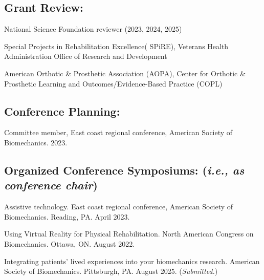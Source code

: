 \documentclass[letterpaper, 10pt]{article}
\begin{document}
\subsection{Grant Review:}
\begin{compactitem} %
    \item National Science Foundation reviewer (2023, 2024, 2025) %
    \item Special Projects in Rehabilitation Excellence( SPiRE), Veterans Health Administration Office of Research and Development
    \item American Orthotic \& Prosthetic Association (AOPA), Center for Orthotic \& Prosthetic Learning and Outcomes/Evidence-Based Practice (COPL)
\end{compactitem} %

\subsection{Conference Planning:}
\begin{compactenum} %
     \item Committee member, East coast regional conference, American Society of Biomechanics. 2023.
\end{compactenum} %

\subsection{Organized Conference Symposiums: (\textit{i.e., as conference chair})}
\begin{compactenum} %
     \item Assistive technology. East coast regional conference, American Society of Biomechanics. Reading, PA. April 2023.
     \item Using Virtual Reality for Physical Rehabilitation. North American Congress on Biomechanics. Ottawa, ON. August 2022.
     \item Integrating patients’ lived experiences into your biomechanics research. American Society of Biomechanics. Pittsburgh, PA. August 2025. (\textit{Submitted.})
\end{compactenum} %
\end{document}
